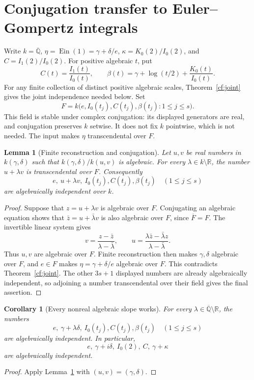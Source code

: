 \documentclass[11pt]{article}
\newtheorem{corollary}[theorem]{Corollary}
\newtheorem{lemma}[theorem]{Lemma}
\theoremstyle{definition}
\theoremstyle{remark}
\newcommand{\Ein}{\operatorname{Ein}}
\begin{document}
\section{Conjugation transfer to Euler--Gompertz integrals}

Write $k=\overline{\mathbb Q}$, $\eta=\Ein(1)=\gamma+\delta/e$,
$\kappa=K_0(2)/I_0(2)$, and $C=I_1(2)/I_0(2)$. For positive algebraic $t$, put
\[
 C(t)=\frac{I_1(t)}{I_0(t)},\qquad
 \beta(t)=\gamma+\log(t/2)+\frac{K_0(t)}{I_0(t)}.
\]
For any finite collection of distinct positive algebraic scales,
Theorem~\ref{cf:joint} gives the joint independence needed below.
Set
\[
 F=k\bigl(e,I_0(t_j),C(t_j),\beta(t_j):1\le j\le s\bigr).
\]
This field is stable under complex conjugation: its displayed generators
are real, and conjugation preserves $k$ setwise. It does not fix $k$
pointwise, which is not needed. The input makes $\eta$ transcendental over $F$.

\begin{lemma}[Finite reconstruction and conjugation]\label{transfer:lemma}
Let $u,v$ be real numbers in $k(\gamma,\delta)$ such that
$k(\gamma,\delta)/k(u,v)$ is algebraic. For every
$\lambda\in k\setminus\mathbb R$, the number $u+\lambda v$ is transcendental
over $F$. Consequently
\[
 e,\ u+\lambda v,\ I_0(t_j),C(t_j),\beta(t_j)\quad(1\le j\le s)
\]
are algebraically independent over $k$.
\end{lemma}
\begin{proof}
Suppose that $z=u+\lambda v$ is algebraic over $F$. Conjugating an algebraic
equation shows that $\bar z=u+\bar\lambda v$ is also algebraic over $F$,
since $\overline F=F$. The invertible linear system gives
\[
 v=\frac{z-\bar z}{\lambda-\bar\lambda},\qquad
 u=\frac{\lambda\bar z-\bar\lambda z}{\lambda-\bar\lambda}.
\]
Thus $u,v$ are algebraic over $F$. Finite reconstruction then makes
$\gamma,\delta$ algebraic over $F$, and $e\in F$ makes
$\eta=\gamma+\delta/e$ algebraic over $F$. This contradicts
Theorem~\ref{cf:joint}. The other $3s+1$ displayed numbers are already
algebraically independent, so adjoining a number transcendental over their
field gives the final assertion.
\end{proof}

\begin{corollary}[Every nonreal algebraic slope works]\label{transfer:slope}
For every $\lambda\in\overline{\mathbb Q}\setminus\mathbb R$, the numbers
\[
 e,\ \gamma+\lambda\delta,\ I_0(t_j),C(t_j),\beta(t_j)
 \quad(1\le j\le s)
\]
are algebraically independent. In particular,
\[
 e,\ \gamma+i\delta,\ I_0(2),\ C,\ \gamma+\kappa
\]
are algebraically independent.
\end{corollary}
\begin{proof}
Apply Lemma~\ref{transfer:lemma} with $(u,v)=(\gamma,\delta)$.
\end{proof}
\end{document}
